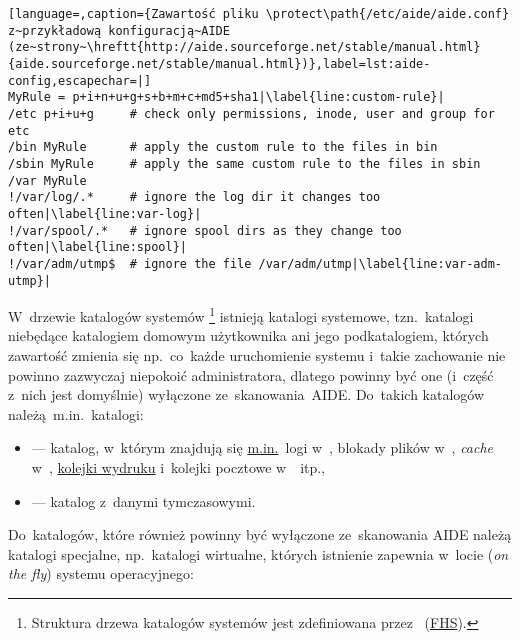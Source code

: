 \documentclass[thesis]{subfiles}
\begin{document}
\begin{lstlisting}[language=,caption={Zawartość pliku \protect\path{/etc/aide/aide.conf} z~przykładową konfiguracją~AIDE (ze~strony~\hreftt{http://aide.sourceforge.net/stable/manual.html}{aide.sourceforge.net/stable/manual.html})},label=lst:aide-config,escapechar=|]
MyRule = p+i+n+u+g+s+b+m+c+md5+sha1|\label{line:custom-rule}|
/etc p+i+u+g     # check only permissions, inode, user and group for etc
/bin MyRule      # apply the custom rule to the files in bin
/sbin MyRule     # apply the same custom rule to the files in sbin
/var MyRule
!/var/log/.*     # ignore the log dir it changes too often|\label{line:var-log}|
!/var/spool/.*   # ignore spool dirs as they change too often|\label{line:spool}|
!/var/adm/utmp$  # ignore the file /var/adm/utmp|\label{line:var-adm-utmp}|
\end{lstlisting}

W~drzewie katalogów systemów \footnote{Struktura drzewa katalogów systemów  jest zdefiniowana przez ~(\href{http://www.tldp.org/LDP/sag/html/fs-background.html}{FHS}).} istnieją katalogi systemowe, tzn.~katalogi niebędące katalogiem domowym użytkownika ani jego podkatalogiem, których zawartość zmienia się np.~co~każde uruchomienie systemu i~takie zachowanie nie powinno zazwyczaj niepokoić administratora, dlatego powinny być one (i~część z~nich jest domyślnie) wyłączone ze~skanowania~AIDE. Do~takich katalogów należą~m.in.~katalogi:

\begin{itemize}
	\item {} --- katalog, w~którym znajdują się \href{http://www.linuxpl.org/SAG/x547.html}{m.in.}~logi w~, blokady plików w~, \emph{cache} w~, \href{http://www.tldp.org/HOWTO/Printing-Usage-HOWTO-2.html}{kolejki wydruku} i~kolejki pocztowe w~~itp.,
	\item {} --- katalog z~danymi tymczasowymi.
\end{itemize}

 Do~katalogów, które również powinny być wyłączone ze~skanowania AIDE należą katalogi specjalne, np.~katalogi wirtualne, których istnienie zapewnia w~locie (\emph{on the fly})  systemu operacyjnego:
\end{document}
